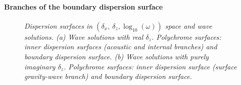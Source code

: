\paragraph{Branches of the boundary dispersion surface}
%
\begin{figure}[h]
	\centering
	\centering		
	\caption{\textit{Dispersion surfaces in $(\delta_x,\ \delta_z,\log_{10}(\omega))$  space and wave solutions.
		(a) Wave solutions with real $\delta_z$. Polychrome surfaces: inner dispersion surfaces (acoustic and internal branches) and boundary dispersion surface.
		(b) Wave solutions with purely imaginary $\delta_z$. Polychrome surfaces: inner dispersion surface (surface gravity-wave branch) and boundary dispersion surface.
	}
}
\label{FigDispSolutions}
\end{figure}
